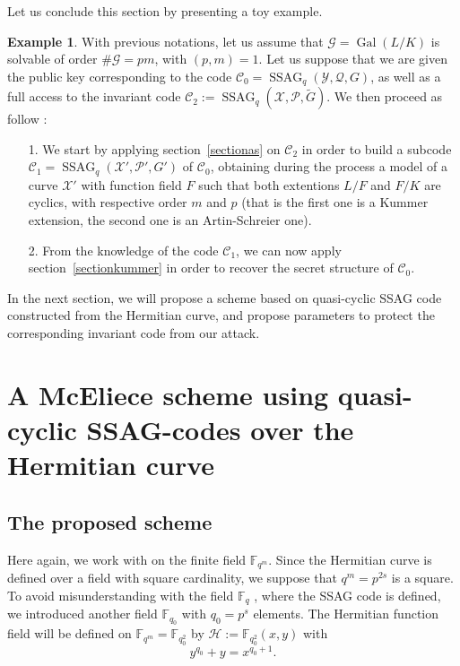 \documentclass[10pt]{article}
\theoremstyle{definition}
\theoremstyle{definition}
\theoremstyle{definition}
\newtheorem{expl}[thm]{Example}
\newcommand{\s}{\vspace{0.3cm}}
\newcommand{\C}{\mathcal{C}}
\newcommand{\fqm}{\mathbb{F}_{q^m}}
\newcommand{\fq}{\mathbb{F}_q}
\newcommand{\X}{\mathcal{X}}
\newcommand{\Y}{\mathcal{Y}}
\newcommand{\PR}{\mathcal{P}}
\newcommand{\QR}{\mathcal{Q}}
\newcommand{\G}{\mathcal{G}}
\newcommand{\Gal}{\operatorname{Gal}}
\newcommand{\ssag}{\operatorname{SSAG}}
\begin{document}
Let us conclude this section by presenting a toy example.

\begin{expl} With previous notations, let us assume that $\G=\Gal(L/K)$ is solvable of order $\#\G = pm$, with $(p,m)=1$. Let us suppose that we are given the public key corresponding to the code $\C_0 = \ssag_q(\Y,\QR,G)$, as well as a full access to the invariant code $\C_2 := \ssag_q(\X,\PR,\tilde{G})$. We then proceed as follow : 
\begin{enumerate}
\item[1.] We start by applying section~\ref{sectionas} on $\C_2$ in order to build a subcode $\C_1 = \ssag_q(\X',\PR',G')$ of $\C_0$, obtaining during the process a model of a curve $\X'$ with function field $F$ such that both extentions $L/F$ and $F/K$ are cyclics, with respective order $m$ and $p$ (that is the first one is a Kummer extension, the second one is an Artin-Schreier one).
\item[2.] From the knowledge of the code $\C_1$, we can now apply section~\ref{sectionkummer} in order to recover the secret structure of $\C_0$.
\end{enumerate}
\end{expl}

\s

In the next section, we will propose a scheme based on quasi-cyclic SSAG code constructed from the Hermitian curve, and propose parameters to protect the corresponding invariant code from our attack.

\s

\section{A McEliece scheme using quasi-cyclic SSAG-codes over the Hermitian curve}

\s

\subsection{The proposed scheme}

\s

\color{purple}
Here again, we work with on the finite field $\fqm$. Since the Hermitian curve is defined over a field with square cardinality, we suppose that $q^m = p^{2s}$ is a square. To avoid misunderstanding with the field $\fq$ , where the SSAG code is
defined, we introduced another field $\mathbb{F}_{q_0}$ with $q_0 = p^s$ elements.   
The Hermitian function field will be defined on $\fqm = \mathbb{F}_{q_0^2}$ by $\mathcal{H} := \mathbb{F}_{q_0^2}(x,y)$ with
\[y^{q_0}+y=x^{q_0+1}.\]
\color{black}
\end{document}
